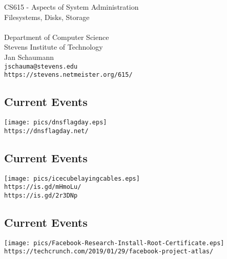 \documentclass[xga]{xdvislides}
\begin{document}
\setfontphv

\lhead{\slidetitle}				%
\cfoot{\relax}					%
\rfoot{\Gray{\today}}

\vspace*{\fill}
\begin{center}
	\Hugesize
		CS615 - Aspects of System Administration\\ [1em]
		Filesystems, Disks, Storage\\ [1em]
	\hspace*{5mm}\blueline\\ [1em]
	\Normalsize
		Department of Computer Science\\
		Stevens Institute of Technology\\
		Jan Schaumann\\
		\verb+jschauma@stevens.edu+ \\
		\verb+https://stevens.netmeister.org/615/+
\end{center}
\vspace*{\fill}

\subsection{Current Events}
\vfill
\begin{center}
	\texttt{[image: pics/dnsflagday.eps]} \\
	\verb+https://dnsflagday.net/+
\end{center}
\vfill

\subsection{Current Events}
\vfill
\begin{center}
	\texttt{[image: pics/icecubelayingcables.eps]} \\
	\verb+https://is.gd/mHmoLu/+ \\
	\verb+https://is.gd/2r3DNp+
\end{center}
\vfill

\subsection{Current Events}
\vfill
\begin{center}
	\texttt{[image: pics/Facebook-Research-Install-Root-Certificate.eps]} \\
	\verb+https://techcrunch.com/2019/01/29/facebook-project-atlas/+
\end{center}
\vfill
\end{document}
